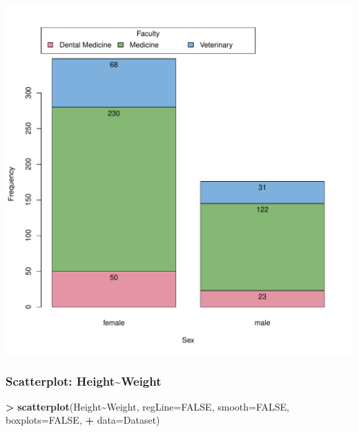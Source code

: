 \documentclass[
]{article}
\newenvironment{Shaded}{\begin{snugshade}}{\end{snugshade}}
\newcommand{\AttributeTok}[1]{\textcolor[rgb]{0.13,0.29,0.53}{#1}}
\newcommand{\ConstantTok}[1]{\textcolor[rgb]{0.56,0.35,0.01}{#1}}
\newcommand{\FunctionTok}[1]{\textcolor[rgb]{0.13,0.29,0.53}{\textbf{#1}}}
\newcommand{\NormalTok}[1]{#1}
\newcommand{\SpecialCharTok}[1]{\textcolor[rgb]{0.81,0.36,0.00}{\textbf{#1}}}
\begin{document}
\includegraphics[width=750px]{RcmdrMarkdown_files/figure-latex/unnamed-chunk-23-1}

\subsubsection{Scatterplot:
Height\textasciitilde Weight}\label{scatterplot-heightweight}

\begin{Shaded}
\begin{Highlighting}[]
\SpecialCharTok{\textgreater{}} \FunctionTok{scatterplot}\NormalTok{(Height}\SpecialCharTok{\textasciitilde{}}\NormalTok{Weight, }\AttributeTok{regLine=}\ConstantTok{FALSE}\NormalTok{, }\AttributeTok{smooth=}\ConstantTok{FALSE}\NormalTok{, }\AttributeTok{boxplots=}\ConstantTok{FALSE}\NormalTok{, }
\SpecialCharTok{+}   \AttributeTok{data=}\NormalTok{Dataset)}
\end{Highlighting}
\end{Shaded}
\end{document}
